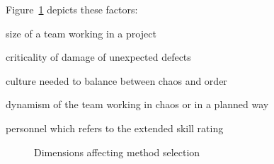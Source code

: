 Figure~\ref{fig:boehm_turner_5axes} depicts these factors:
\begin{inparaenum} [a\upshape)]
\item size of a team working in a project
\item criticality of damage of unexpected defects
\item culture needed to balance between chaos and order
\item dynamism of the team working in chaos or in a planned way
\item personnel which refers to the extended \citet{cockburn2002agile} skill rating %
\end{inparaenum}

\begin{figure}[H]
{\caption{Dimensions affecting method selection} 
\label{fig:boehm_turner_5axes}}
\end{figure}

